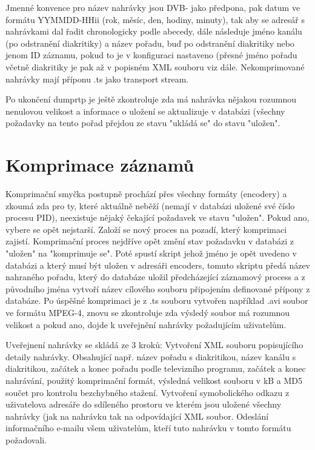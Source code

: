 \vspace{10pt}

Jmenné konvence pro název nahrávky jsou DVB- jako předpona, pak datum ve formátu YYMMDD-HHii (rok, měsíc, den, hodiny, minuty), tak aby se adresář s nahrávkami dal řadit chronologicky podle abecedy, dále následuje jméno kanálu (po odstranění diakritiky) a název pořadu, buď po odstranění diakritiky nebo jenom ID záznamu, pokud to je v konfiguraci nastaveno (přesné jméno pořadu včetně diakritiky je pak až v popisném XML souboru viz dále. Nekomprimované nahrávky mají příponu .ts jako transport stream.

\vspace{10pt}

Po ukončení dumprtp je ještě zkontroluje zda má nahrávka nějakou rozumnou nenulovou velikost a informace o uložení se aktualizuje v databázi (všechny požadavky na tento pořad přejdou ze stavu "ukládá se" do stavu "uložen".
\vspace{10pt}

\section{Komprimace záznamů}

Komprimační smyčka postupně prochází přes všechny formáty (encodery) a zkoumá zda pro ty, které aktuálně neběží (nemají v databázi uložené své číslo procesu PID), neexistuje nějaký čekající požadavek ve stavu "uložen". Pokud ano, vybere se opět nejstarší. Založí se nový proces na pozadí, který komprimaci zajistí. Komprimační proces nejdříve opět změní stav požadavku v databázi z "uložen" na "komprimuje se". Poté spustí skript jehož jméno je opět uvedeno v databázi a který musí být uložen v adresáři encoders, tomuto skriptu předá název nahraného pořadu, který do databáze uložil předcházející záznamový process a z původního jména vytvoří název cílového souboru připojením definované přípony z databáze. Po úspěšné komprimaci je z .ts souboru vytvořen například .avi soubor ve formátu MPEG-4, znovu se zkontroluje zda výsledý soubor má rozumnou velikost a pokud ano, dojde k uveřejnění nahrávky požadujícím uživatelům. 

\vspace{10pt}

Uveřejnení nahrávky se skládá ze 3 kroků:
Vytvoření XML souboru popisujícího detaily nahrávky. Obsahující např. název pořadu s diakritikou, název kanálu s diakritikou, začátek a konec pořadu podle televizního programu, začátek a konec nahrávání, použitý komprimační formát, výsledná velikost souboru v kB a MD5 součet pro kontrolu bezchybného stažení.
Vytvoření symobolického odkazu z uživatelova adresáře do sdíleného prostoru ve kterém jsou uložené všechny nahrávky (jak na nahrávku tak na odpovídající XML soubor.
Odeslání informačního e-mailu všem uživatelům, kteří tuto nahrávku v tomto formátu požadovali.

